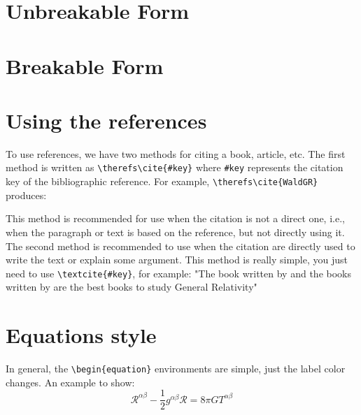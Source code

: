 \documentclass{solutionclass} %
\begin{document}
    \section{Unbreakable Form}\label{ex 1}
    \lipsum[1]
    
    
    \begin{solution}
        \lipsum[1] %
    \end{solution}
    
    \section{Breakable Form}\label{ex 2}
    \lipsum[1]
    \begin{solution}
        \lipsum[1-13]
    \end{solution}
    
    \section{Using the references}

    To use references, we have two methods for citing a book, article, etc. The first method is written as \verb|\therefs\cite{#key}| where \verb|#key| represents the citation key of the bibliographic reference. For example, \verb|\therefs\cite{WaldGR}| produces:
    \therefs\cite{WaldGR,Choquet-BruhatGR}
    
    This method is recommended for use when the citation is not a direct one, i.e., when the paragraph or text is based on the reference, but not directly using it. The second method is recommended to use when the citation are directly used to write the text or explain some argument. This method is really simple, you just need to use \verb|\textcite{#key}|, for example:
    "The book written by \textcite{WaldGR} and the books written by \textcite{Choquet-BruhatGR, Choquet-BruhatGR2} are the best books to study General Relativity"
    
    \section{Equations style}
        In general, the \verb|\begin{equation}| environments are simple, just the label color changes. An example to show:
            \begin{equation}\label{eq: 1}
                \mathcal{R}^{\alpha\beta} - \dfrac{1}{2}g^{\alpha\beta}\mathcal{R} =
                8\pi GT^{\alpha\beta}
            \end{equation}
\end{document}
